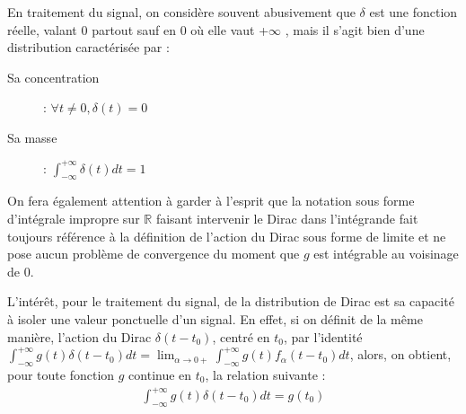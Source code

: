 En traitement du signal, on considère souvent abusivement que $\delta$ est une fonction réelle, valant 0 partout sauf en 0 où elle vaut \og +$\infty$ \fg,  mais il s'agit bien d'une distribution caractérisée par :

\begin{description}
    \item[Sa concentration] : $\forall t \neq 0, \delta(t) = 0$
    \item[Sa masse] : $\int_{-\infty}^{+\infty}\delta(t)dt = 1$
\end{description}

On fera également attention à garder à l'esprit que la notation sous forme d'intégrale impropre sur $\mathbb{R}$ faisant intervenir le Dirac dans l'intégrande fait toujours référence à la définition de l'action du Dirac sous forme de limite et ne pose aucun problème de convergence du moment que $g$ est intégrable au voisinage de 0.

L'intérêt, pour le traitement du signal, de la distribution de Dirac est sa capacité à isoler une valeur ponctuelle d'un signal. En effet, si on définit de la même manière, l'action du Dirac $\delta(t - t_0)$, centré en $t_0$, par l'identité $\int_{-\infty}^{+\infty} g(t) \delta(t-t_0) dt = \lim_{\alpha \to 0+} \int_{-\infty}^{+\infty} g(t) f_{\alpha}(t-t_0) dt$, alors, on obtient, pour toute fonction $g$ continue en $t_0$, la relation suivante :
\begin{align*}
    \int_{-\infty}^{+\infty} g(t) \delta(t-t_0) dt = g(t_0)
\end{align*}

